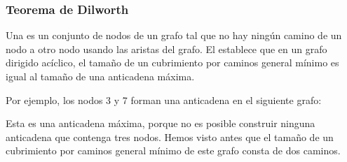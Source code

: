 \begin{center}
\begin{tikzpicture}[scale=0.9]

\end{tikzpicture}
\end{center}

\subsubsection{Teorema de Dilworth}


Una  es un conjunto de nodos de un grafo
tal que no hay ningún camino
de un nodo a otro nodo
usando las aristas del grafo.
El  establece que
en un grafo dirigido acíclico, el tamaño de
un cubrimiento por caminos general mínimo
es igual al tamaño de una anticadena máxima.

Por ejemplo, los nodos 3 y 7 forman una anticadena
en el siguiente grafo:

\begin{center}
\end{center}

Esta es una anticadena máxima, porque no es posible
construir ninguna anticadena que contenga tres nodos.
Hemos visto antes que el tamaño de un cubrimiento por caminos
general mínimo de este grafo consta de dos caminos.
